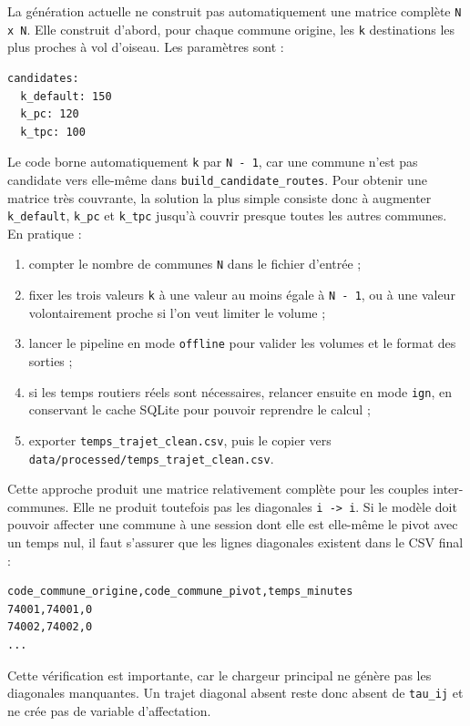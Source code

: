 \documentclass[11pt,a4paper]{article}
\begin{document}
La génération actuelle ne construit pas automatiquement une matrice complète
\texttt{N x N}. Elle construit d'abord, pour chaque commune origine, les
\texttt{k} destinations les plus proches à vol d'oiseau. Les paramètres sont :

\begin{verbatim}
candidates:
  k_default: 150
  k_pc: 120
  k_tpc: 100
\end{verbatim}

Le code borne automatiquement \texttt{k} par \texttt{N - 1}, car une commune
n'est pas candidate vers elle-même dans \texttt{build\_candidate\_routes}. Pour
obtenir une matrice très couvrante, la solution la plus simple consiste donc à
augmenter \texttt{k\_default}, \texttt{k\_pc} et \texttt{k\_tpc} jusqu'à couvrir
presque toutes les autres communes. En pratique :

\begin{enumerate}
\item compter le nombre de communes \texttt{N} dans le fichier d'entrée ;
\item fixer les trois valeurs \texttt{k} à une valeur au moins égale à
  \texttt{N - 1}, ou à une valeur volontairement proche si l'on veut limiter le
  volume ;
\item lancer le pipeline en mode \texttt{offline} pour valider les volumes et le
  format des sorties ;
\item si les temps routiers réels sont nécessaires, relancer ensuite en mode
  \texttt{ign}, en conservant le cache SQLite pour pouvoir reprendre le calcul ;
\item exporter \texttt{temps\_trajet\_clean.csv}, puis le copier vers \texttt{data/processed/temps\_trajet\_clean.csv}.
\end{enumerate}

Cette approche produit une matrice relativement complète pour les couples
inter-communes. Elle ne produit toutefois pas les diagonales
\texttt{i -> i}. Si le modèle doit pouvoir affecter une commune à une session
dont elle est elle-même le pivot avec un temps nul, il faut s'assurer que les
lignes diagonales existent dans le CSV final :

\begin{verbatim}
code_commune_origine,code_commune_pivot,temps_minutes
74001,74001,0
74002,74002,0
...
\end{verbatim}

Cette vérification est importante, car le chargeur principal ne génère pas les
diagonales manquantes. Un trajet diagonal absent reste donc absent de
\texttt{tau\_ij} et ne crée pas de variable d'affectation.
\end{document}

